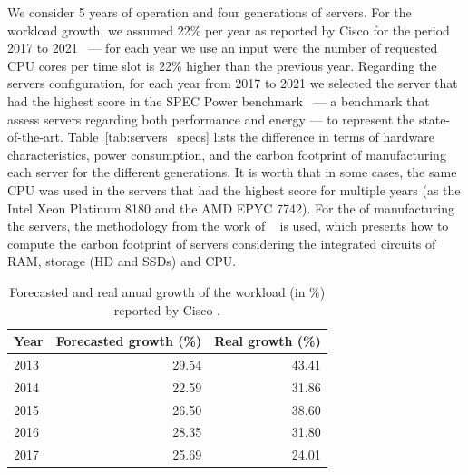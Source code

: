 We consider 5 years of operation and four generations of servers. For the workload growth, we assumed 22\% per year as reported by Cisco for the period 2017 to 2021~\cite{cisco_global_cloud_index_2018} --- for each year we use an input were the number of requested CPU cores per time slot is 22\% higher than the previous year. Regarding the servers configuration, for each year from 2017 to 2021 we selected the server that had the highest score in the SPEC Power benchmark~\cite{spec_power} --- a benchmark that assess servers regarding both performance and energy --- to represent the state-of-the-art. Table~\ref{tab:servers_specs} lists the difference in terms of hardware characteristics, power consumption, and the carbon footprint of manufacturing each server for the different generations.  It is worth  that in some cases, the same CPU was used in the servers that had the highest score for multiple years (as the Intel Xeon Platinum 8180 and the AMD EPYC 7742). For the  of manufacturing the servers, the methodology from the work of ~\citet{gupta2022_ACT} is used, which presents how to compute the carbon footprint of servers considering the integrated circuits of  RAM, storage (HD and SSDs) and CPU.



\begin{table}[h]
  \caption{Forecasted and real anual growth of the workload (in \%) reported by Cisco \cite{cisco_global_cloud_index_2012,cisco_global_cloud_index_2013,cisco_global_cloud_index_2014,cisco_global_cloud_index_2015,cisco_global_cloud_index_2018}.} \centering
  \label{tab:workload_forecast_and_real_growth} 
  \begin{tabular}{|l|r|r|}
  \hline    
    \textbf{Year} & \textbf{Forecasted growth (\%)} &   \textbf{Real growth (\%)}  \\
  \hline
   2013     & 29.54 & 43.41 \\
  \hline
   2014    & 22.59 & 31.86 \\
  \hline
   2015 &    26.50 & 38.60 \\
  \hline
  2016   & 28.35 & 31.80 \\
  \hline
  2017   & 25.69 & 24.01 \\
  \hline  
\end{tabular}  
\end{table}




